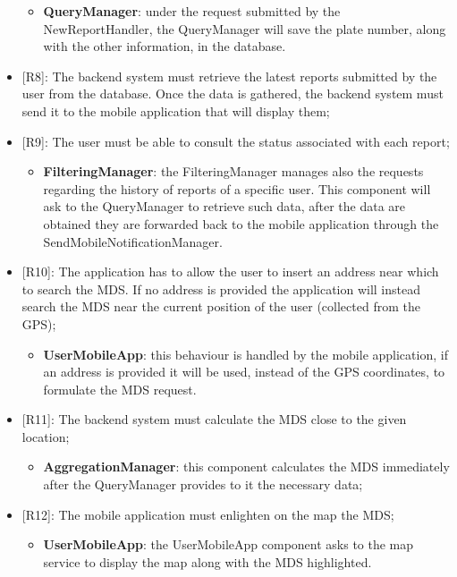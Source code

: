 \begin{itemize}
    \begin{itemize}
      \item \textbf{QueryManager}: under the request submitted by the \\ NewReportHandler, the QueryManager will save the plate number, along with the other information, in the database. 
    \end{itemize} 
    \item {[R8]}: The backend system must retrieve the latest reports submitted by the user from the database. Once the data is gathered, the backend system must send it to the mobile application that will display them; 
    \item[] {[R9]}: The user must be able to consult the status associated with each report;
    \begin{itemize}
      \item \textbf{FilteringManager}: the FilteringManager manages also the requests regarding the history of reports of a specific user. This component will ask to the QueryManager to retrieve such data, after the data are obtained they are forwarded back to the mobile application through the SendMobileNotificationManager.
    \end{itemize}
    \item {[R10]}: The application has to allow the user to insert an address near which to search the MDS. If no address is provided the application will instead search the MDS near the current position of the user (collected from the GPS);
    \begin{itemize}
      \item \textbf{UserMobileApp}: this behaviour is handled by the mobile application, if an address is provided it will be used, instead of the GPS coordinates, to formulate the MDS request.  
    \end{itemize} 
    \item {[R11]}: The backend system must calculate the MDS close to the given location;
    \begin{itemize}
      \item \textbf{AggregationManager}: this component calculates the MDS immediately after the QueryManager provides to it the necessary data; 
    \end{itemize} 
    \item {[R12]}: The mobile application must enlighten on the map the MDS;
    \begin{itemize}
      \item \textbf{UserMobileApp}: the UserMobileApp component asks to the map service to display the map along with the MDS highlighted.

\end{itemize}
\end{itemize}
